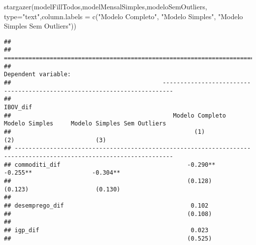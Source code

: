 \documentclass[
]{article}
\newenvironment{Shaded}{\begin{snugshade}}{\end{snugshade}}
\newcommand{\AttributeTok}[1]{\textcolor[rgb]{0.77,0.63,0.00}{#1}}
\newcommand{\FunctionTok}[1]{\textcolor[rgb]{0.00,0.00,0.00}{#1}}
\newcommand{\NormalTok}[1]{#1}
\newcommand{\StringTok}[1]{\textcolor[rgb]{0.31,0.60,0.02}{#1}}
\begin{document}
\begin{Shaded}
\begin{Highlighting}[]
\FunctionTok{stargazer}\NormalTok{(modelFillTodos,modelMensalSimples,modeloSemOutliers, }\AttributeTok{type=}\StringTok{"text"}\NormalTok{,}\AttributeTok{column.labels =} \FunctionTok{c}\NormalTok{(}\StringTok{"Modelo Completo"}\NormalTok{,}
                                                                                             \StringTok{"Modelo Simples"}\NormalTok{,}
                                                                                             \StringTok{"Modelo Simples Sem Outliers"}\NormalTok{))}
\end{Highlighting}
\end{Shaded}

\begin{verbatim}
## 
## ===================================================================================================================
##                                                                      Dependent variable:                           
##                                           -------------------------------------------------------------------------
##                                                                           IBOV_dif                                 
##                                              Modelo Completo         Modelo Simples     Modelo Simples Sem Outliers
##                                                    (1)                    (2)                       (3)            
## -------------------------------------------------------------------------------------------------------------------
## commoditi_dif                                    -0.290**               -0.255**                 -0.304**          
##                                                  (0.128)                (0.123)                   (0.130)          
##                                                                                                                    
## desemprego_dif                                    0.102                                                            
##                                                  (0.108)                                                           
##                                                                                                                    
## igp_dif                                           0.023                                                            
##                                                  (0.525)                                                           

\end{verbatim}
\end{document}
